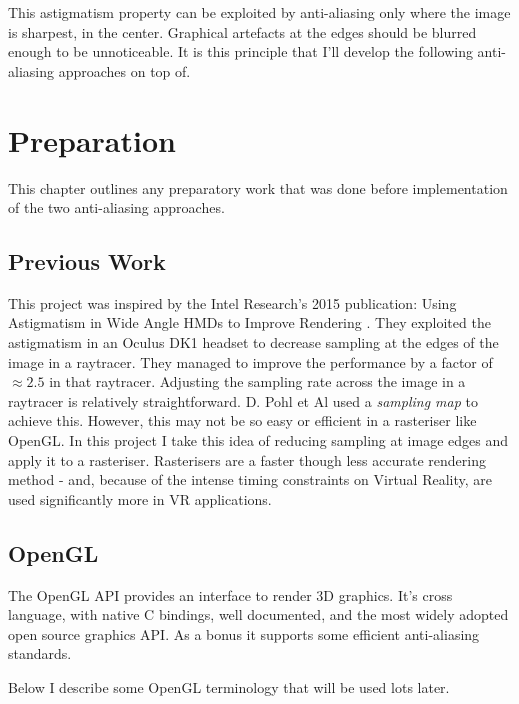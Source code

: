 \documentclass[12pt,a4paper,twoside,openright]{report}
\begin{document}
This astigmatism property can be exploited by anti-aliasing only where the image is sharpest, in the center. Graphical artefacts at the edges should be blurred enough to be unnoticeable. It is this principle that I'll develop the following anti-aliasing approaches on top of.

\chapter{Preparation}

This chapter outlines any preparatory work that was done before implementation of the two anti-aliasing approaches.

\section{Previous Work}

This project was inspired by the Intel Research's 2015 publication: Using Astigmatism in Wide Angle HMDs to Improve Rendering \cite{Astigpap}. They exploited the astigmatism in an Oculus DK1 headset to decrease sampling at the edges of the image in a raytracer. They managed to improve the performance by a factor of $\approx 2.5$ in that raytracer.
Adjusting the sampling rate across the image in a raytracer is relatively straightforward. D. Pohl et Al used a \emph{sampling map} to achieve this. However, this may not be so easy or efficient in a rasteriser like OpenGL. In this project I take this idea of reducing sampling at image edges and apply it to a rasteriser. Rasterisers are a faster though less accurate rendering method - and, because of the intense timing constraints on Virtual Reality, are used significantly more in VR applications. 

\section{OpenGL}

The OpenGL API provides an interface to render 3D graphics. It's cross language, with native C bindings, well documented, and the most widely adopted open source graphics API. As a bonus it supports some efficient anti-aliasing standards.

Below I describe some OpenGL terminology that will be used lots later.
\end{document}
